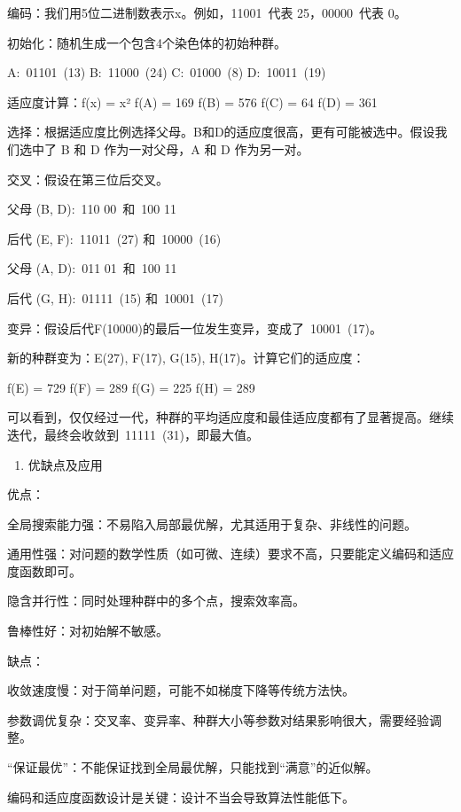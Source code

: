 编码：我们用5位二进制数表示x。例如，11001~代表 25，00000~代表 0。

初始化：随机生成一个包含4个染色体的初始种群。

A:~01101~(13) B:~11000~(24) C:~01000~(8) D:~10011~(19)

适应度计算：f(x) = x² f(A) = 169 f(B) = 576 f(C) = 64 f(D) = 361

选择：根据适应度比例选择父母。B和D的适应度很高，更有可能被选中。假设我们选中了 B 和 D 作为一对父母，A 和 D 作为另一对。

交叉：假设在第三位后交叉。

父母 (B, D):~110 \textbar{} 00~和~100 \textbar{} 11

后代 (E, F):~11011~(27) 和~10000~(16)

父母 (A, D):~011 \textbar{} 01~和~100 \textbar{} 11

后代 (G, H):~01111~(15) 和~10001~(17)

变异：假设后代F(10000)的最后一位发生变异，变成了~10001~(17)。

新的种群变为：E(27), F(17), G(15), H(17)。计算它们的适应度：

f(E) = 729 f(F) = 289 f(G) = 225 f(H) = 289

可以看到，仅仅经过一代，种群的平均适应度和最佳适应度都有了显著提高。继续迭代，最终会收敛到~11111~(31)，即最大值。

\begin{enumerate}
\def\labelenumi{\arabic{enumi}.}
\setcounter{enumi}{3}
\tightlist
\item
  优缺点及应用
\end{enumerate}

优点：

全局搜索能力强：不易陷入局部最优解，尤其适用于复杂、非线性的问题。

通用性强：对问题的数学性质（如可微、连续）要求不高，只要能定义编码和适应度函数即可。

隐含并行性：同时处理种群中的多个点，搜索效率高。

鲁棒性好：对初始解不敏感。

缺点：

收敛速度慢：对于简单问题，可能不如梯度下降等传统方法快。

参数调优复杂：交叉率、变异率、种群大小等参数对结果影响很大，需要经验调整。

``保证最优''：不能保证找到全局最优解，只能找到``满意''的近似解。

编码和适应度函数设计是关键：设计不当会导致算法性能低下。


